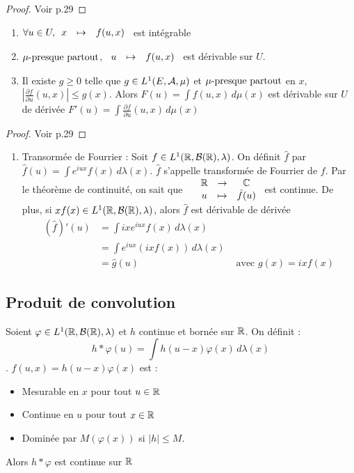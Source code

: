 \documentclass[]{report}
\begin{document}
\begin{proof}{}{}
    Voir p.29
\end{proof}

\begin{tm}{}{}
    \begin{enumerate}
        \item $\forall u \in U, \begin{array}{ccccc} x & \mapsto & f(u,x) \end{array}$ est intégrable
        \item $\mu\text{-presque partout}$, $\begin{array}{ccccc} u & \mapsto & f(u,x) \end{array}$ est dérivable sur $U$.
        \item Il existe $g\ge0$ telle que $g\in L^1(E,\mathcal{A},\mu)$ et $\mu\text{-presque partout}$ en $x$, $\left|\frac{\partial f}{\partial u} (u,x)\right|\le g(x)$. Alors $F(u)=\int f(u,x)\,d\mu(x)$ est dérivable sur $U$ de dérivée $F'(u)=\int \frac{\partial f}{\partial u}(u,x)\,d\mu(x)$
    \end{enumerate}
\end{tm}

\begin{proof}{}{}
    Voir p.29
\end{proof}

\begin{ex}{}{}
    \begin{enumerate}
        \item Transormée de Fourrier : Soit $f\in L^1(\mathbb{R},\mathcal{B}(\mathbb{R}),\lambda)$. On définit $\hat{f}$ par $\hat{f}(u)=\int e^{iux}f(x)\,d\lambda(x)$. $\hat{f}$ s'appelle transformée de Fourrier de $f$. Par le théorème de continuité, on sait que $\begin{array}{ccccc} & \mathbb{R} & \to & \mathbb{C} \\ & u & \mapsto & \hat{f}(u) \end{array}$ est continue. De plus, si $xf(x)\in L^1(\mathbb{R},\mathcal{B}(\mathbb{R}),\lambda)$, alors $\hat{f}$ est dérivable de dérivée
        \begin{align*}
        (\hat{f})'(u)&=\int ixe^{iux}f(x)\,d\lambda(x)\\
        &=\int e^{iux}(ixf(x))\,d\lambda(x)\\
        &=\hat{g}(u)&\text{ avec $g(x)=ixf(x)$}
        \end{align*}
    \end{enumerate}
\end{ex}

\subsection*{Produit de convolution}

Soient $\varphi\in L^1(\mathbb{R},\mathcal{B}(\mathbb{R}),\lambda)$ et $h$ continue et bornée sur $\mathbb{R}$. On définit :
$$h\ast\varphi(u)=\int h(u-x)\varphi(x)\,d\lambda(x)$$.
$f(u,x)=h(u-x)\varphi(x)$ est :
\begin{itemize}
    \item Mesurable en $x$ pour tout $u\in\mathbb{R}$
    \item Continue en $u$ pour tout $x\in \mathbb{R}$
    \item Dominée par $M(\varphi(x))$ si $|h|\le M$.
\end{itemize}
Alors $h\ast \varphi$ est continue sur $\mathbb{R}$
\end{document}
